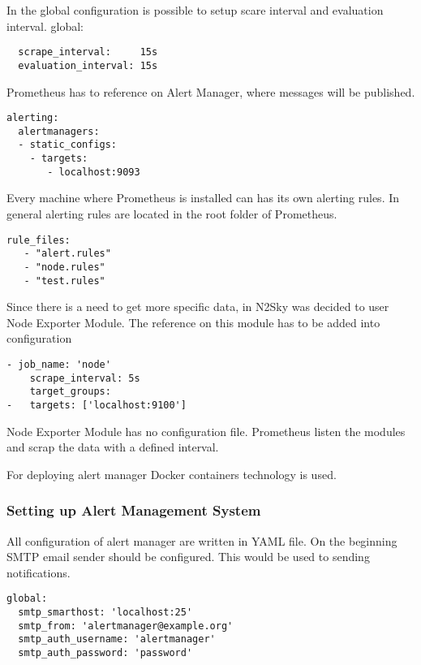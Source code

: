  In the global configuration is possible to setup scare interval and evaluation interval.
global:
 
 \begin{lstlisting}
  scrape_interval:     15s 
  evaluation_interval: 15s 
\end{lstlisting}

Prometheus has to reference on Alert Manager, where messages will be published. 
 \begin{lstlisting}
alerting:
  alertmanagers:
  - static_configs:
    - targets:
       - localhost:9093
\end{lstlisting}

Every machine where Prometheus is installed can has its own alerting rules. In general alerting rules are located in the root folder of Prometheus.

 \begin{lstlisting}
rule_files:
   - "alert.rules"
   - "node.rules"
   - "test.rules"
\end{lstlisting}

Since there is a need to get more specific data, in N2Sky was decided to user Node Exporter Module. The reference on this module has to be added into configuration

 \begin{lstlisting}
- job_name: 'node'
    scrape_interval: 5s
    target_groups:
-	targets: ['localhost:9100']
\end{lstlisting}

Node Exporter Module has no configuration file. Prometheus listen the modules and scrap the data with a defined interval.

For deploying alert manager Docker containers technology is used.

\subsubsection{Setting up Alert Management System}\label{Setting up Alert Management System}

All configuration of alert manager are written in YAML file. 
On the beginning SMTP email sender should be configured. This would be used to sending notifications.

 \begin{lstlisting}
global:
  smtp_smarthost: 'localhost:25'
  smtp_from: 'alertmanager@example.org'
  smtp_auth_username: 'alertmanager'
  smtp_auth_password: 'password'
\end{lstlisting}

